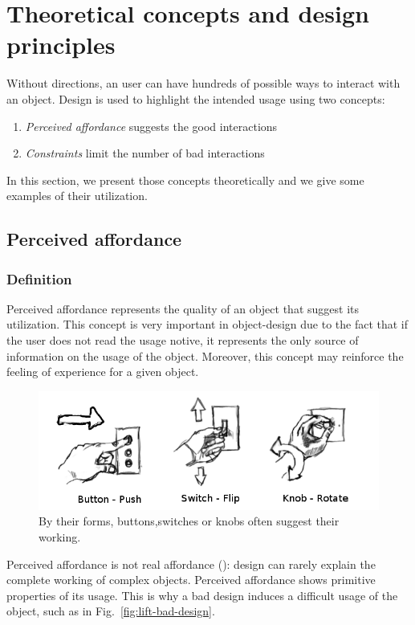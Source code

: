 \documentclass[a4paper,11pt] {article}
\theoremstyle{definition}
\begin{document}
\section{Theoretical concepts and design principles}

Without directions, an user can have hundreds of possible ways to interact with an object. Design is used to highlight the intended usage using two concepts:
\begin{enumerate}
\item \textit{Perceived affordance} suggests the good interactions
\item \textit{Constraints} limit the number of bad interactions
\end{enumerate}

In this section, we present those concepts theoretically and we give some examples of their utilization.

\label{sct:theory}

    \subsection{Perceived affordance}
        \subsubsection{Definition}
Perceived affordance represents the quality of an object that suggest its utilization. This concept is very important in object-design due to the fact that if the user does not read the usage notive, it represents the only source of information on the usage of the object. Moreover, this concept may reinforce the feeling of experience for a given object.

\begin{figure}[h]
\centering
\includegraphics[scale=0.40]{fig-report/switches-only.png}
\caption{By their forms, buttons,switches or knobs often suggest their working.}
\end{figure}

Perceived affordance is not real affordance (\cite{affordancesMads}): design can rarely explain the complete working of complex objects. Perceived affordance shows primitive properties of its usage. This is why a bad design induces a difficult usage of the object, such as in Fig.~\ref{fig:lift-bad-design}.
\end{document}
